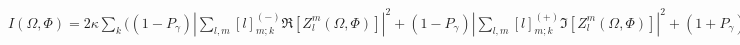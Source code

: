\documentclass{standalone}
\begin{document}
\begin{math}
  I(\Omega,\Phi) = 2\kappa\sum_{k}\Bigg(
  (1-P_{\gamma})\left|\sum_{l,m}[l]_{m;k}^{(-)}\Re[Z_{l}^{m}(\Omega,\Phi)]\right|^2
  +(1-P_{\gamma})\left|\sum_{l,m}[l]_{m;k}^{(+)}\Im[Z_{l}^{m}(\Omega,\Phi)]\right|^2
  +(1+P_{\gamma})\left|\sum_{l,m}[l]_{m;k}^{(+)}\Re[Z_{l}^{m}(\Omega,\Phi)]\right|^2
  +(1+P_{\gamma})\left|\sum_{l,m}[l]_{m;k}^{(-)}\Im[Z_{l}^{m}(\Omega,\Phi)]\right|^2
  \Bigg)
\end{math}
\end{document}
